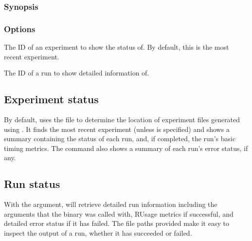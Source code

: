 \documentclass[a4paper,english]{article}
\begin{document}
\begin{adjustwidth}{18pt}{0pt}
            \subsubsection{Synopsis}

            \subsubsection{Options}
                \begin{Description}[Options]
                \item[\Arg{experiment-id}]
                The ID of an experiment to show the status of.
                By default, this is the most recent experiment.
                \item[\OptArg{-i}{ run-id}]
                The ID of a run to show detailed information of.
                \end{Description}

            \subsection{Experiment status}
                By default,   uses the  file to determine the
                location of experiment files generated using  .
                It finds the most recent experiment (unless  is specified) and shows a summary
                containing the status of each run, and, if completed, the run's basic timing metrics.
                The command also shows a summary of each run's error status, if any.

                \subsection{Run status}
                    With the  argument,   will retrieve detailed
                    run information including the arguments that the binary was called with, RUsage metrics
                    if successful, and detailed error status if it has failed.
                    The file paths provided make it easy to inspect the output of a run, whether it has
                    succeeded or failed.


\end{adjustwidth}
\end{document}
